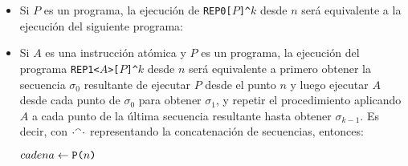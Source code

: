 \begin{itemize}
\item Si $P$ es un programa, la ejecución de \verb#REP0[#$P$\verb#]^#$k$ desde $n$ será equivalente a la ejecución del siguiente programa: 

\begin{center}

\begin{algorithm}
\end{algorithm}


\end{center}



\item Si $A$ es una instrucción atómica y $P$ es un programa, la ejecución del programa 
\verb#REP1<#$A$\verb#>[#$P$\verb#]^#$k$ desde $n$ será equivalente a primero obtener la secuencia $\sigma_0$ resultante de ejecutar $P$ desde el punto $n$  y luego ejecutar $A$ desde cada punto de $\sigma_0$ para obtener $\sigma_1$, y repetir el procedimiento aplicando $A$ a cada punto de la última secuencia resultante hasta obtener $\sigma_{k-1}$. Es decir, con $\cdot{}^\smallfrown\cdot$ representando la concatenación de secuencias, entonces:

\begin{center}
\begin{algorithm}
  $cadena \leftarrow \FuncSty{P(}n\FuncSty{)}$\;
  \;
\end{algorithm}
\end{center}




\end{itemize}
